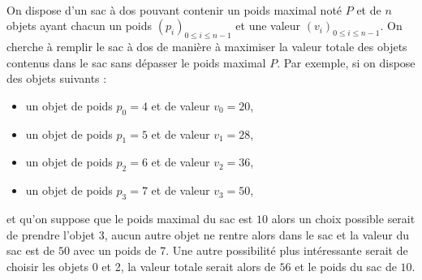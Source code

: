 \documentclass[11pt,a4paper]{article}
\begin{document}
\begin{Exercise}[title={Problème du sac à dos}]\\
	On dispose d'un sac à dos pouvant contenir un poids maximal noté $P$ et de $n$ objets ayant chacun un poids $\left(p_i\right)_{0\leqslant i \leqslant n-1}$ et une valeur $\left(v_i\right)_{0\leqslant i \leqslant n-1}$. On cherche à remplir le sac à dos de manière à maximiser la valeur totale des objets contenus dans le sac sans dépasser le poids maximal $P$.
	Par exemple, si on dispose des objets suivants :
	\begin{itemize}
		\item un objet de poids $p_0 = 4$ et de valeur $v_0 = 20$,
		\item un objet de poids $p_1 = 5$ et de valeur $v_1 = 28$,
		\item un objet de poids $p_2 = 6$ et de valeur $v_2 = 36$,
		\item un objet de poids $p_3 = 7$ et de valeur $v_3 = 50$,
	\end{itemize}
	et qu'on suppose que le poids maximal du sac est $10$ alors un choix possible serait de prendre l'objet 3, aucun autre objet ne rentre alors dans le sac et la valeur du sac est  de $50$ avec un poids de 7. Une autre possibilité plus intéressante serait de choisir les objets 0  et 2, la valeur totale serait alors de $56$ et le poids du sac de $10$.\smallskip


\end{Exercise}
\end{document}
